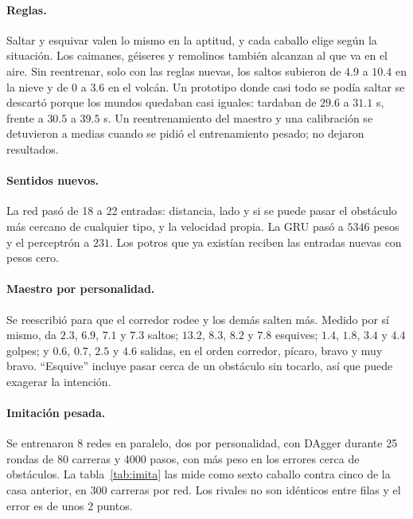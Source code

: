 \documentclass[11pt,letterpaper]{article}
\begin{document}
\paragraph{Reglas.} Saltar y esquivar valen lo mismo en la aptitud, y cada caballo elige según la situación. Los caimanes, géiseres y remolinos también alcanzan al que va en el aire. Sin reentrenar, solo con las reglas nuevas, los saltos subieron de $4.9$ a $10.4$ en la nieve y de $0$ a $3.6$ en el volcán. Un prototipo donde casi todo se podía saltar se descartó porque los mundos quedaban casi iguales: tardaban de $29.6$ a $31.1$ s, frente a $30.5$ a $39.5$ s. Un reentrenamiento del maestro y una calibración se detuvieron a medias cuando se pidió el entrenamiento pesado; no dejaron resultados.

\paragraph{Sentidos nuevos.} La red pasó de 18 a 22 entradas: distancia, lado y si se puede pasar el obstáculo más cercano de cualquier tipo, y la velocidad propia. La GRU pasó a $5346$ pesos y el perceptrón a $231$. Los potros que ya existían reciben las entradas nuevas con pesos cero.

\paragraph{Maestro por personalidad.} Se reescribió para que el corredor rodee y los demás salten más. Medido por sí mismo, da $2.3$, $6.9$, $7.1$ y $7.3$ saltos; $13.2$, $8.3$, $8.2$ y $7.8$ esquives; $1.4$, $1.8$, $3.4$ y $4.4$ golpes; y $0.6$, $0.7$, $2.5$ y $4.6$ salidas, en el orden corredor, pícaro, bravo y muy bravo. ``Esquive'' incluye pasar cerca de un obstáculo sin tocarlo, así que puede exagerar la intención.

\paragraph{Imitación pesada.} Se entrenaron 8 redes en paralelo, dos por personalidad, con DAgger durante 25 rondas de 80 carreras y 4000 pasos, con más peso en los errores cerca de obstáculos. La tabla~\ref{tab:imita} las mide como sexto caballo contra cinco de la casa anterior, en 300 carreras por red. Los rivales no son idénticos entre filas y el error es de unos 2 puntos.
\end{document}
